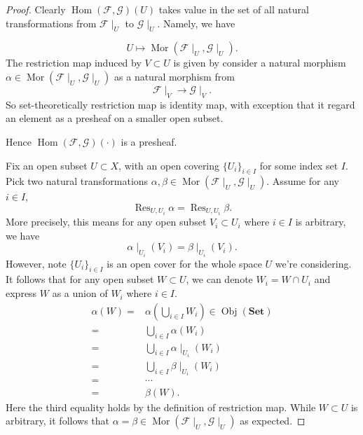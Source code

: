 \begin{proof}
Clearly $\operatorname{Hom}(\mathscr F,\mathscr G)(U)$ takes value in the set of all natural transformations from $\mathscr F\mid_U$ to $\mathscr G\mid_U$. Namely, we have 

\[U\mapsto \operatorname{Mor}(\mathscr F\mid_U,\mathscr G\mid_U).\]
The restriction map induced by $V\subset U$ is given by consider a natural morphism $\alpha\in\operatorname{Mor}(\mathscr F\mid_U,\mathscr G\mid_U)$ as a natural morphism from 
\[\mathscr F\mid_V\to \mathscr G\mid_V.\]So set-theoretically restriction map is identity map, with exception that it regard an element as a presheaf on a smaller open subset.

Hence $\operatorname{Hom}(\mathscr F,\mathscr G)(\cdot)$ is a presheaf. 

Fix an open subset $U\subset X$, with an open covering $\{U_i\}_{i\in I}$ for some index set $I$. Pick two natural transformations $\alpha,\beta\in\operatorname{Mor}(\mathscr F\mid_U,\mathscr G\mid_U)$. Assume for any $i\in I$, 
\[\operatorname{Res}_{U,U_i}\alpha=\operatorname{Res}_{U,U_i}\beta.\]
More precisely, this means for any open subset $V_i\subset U_i$ where $i\in I$ is arbitrary, we have 
\[\alpha\mid_{U_i}(V_i)=\beta\mid_{U_i}(V_i).\]
However, note $\{U_i\}_{i\in I}$ is an open cover for the whole space $U$ we're considering. It follows that for any open subset $W\subset U$, we can denote $W_i=W\cap U_i$ and express $W$ as a union of $W_i$ where $i\in I$.
\begin{align*}
	\alpha(W)=&\alpha\left(\bigcup_{i\in I} W_i\right) \in \operatorname{Obj}(\textbf{Set})\\
	=& \bigcup_{i\in I}\alpha(W_i)\\
	=& \bigcup_{i\in I}\alpha\mid_{U_i}(W_i)\\
	=& \bigcup_{i\in I}\beta\mid_{U_i}(W_i)\\
	=& \cdots\\
	=&\beta(W).
\end{align*}Here the third equality holds by the definition of restriction map. While $W\subset U$ is arbitrary, it follows that $\alpha=\beta\in\operatorname{Mor}(\mathscr F\mid_U,\mathscr G\mid_U)$ as expected. 


\end{proof}
